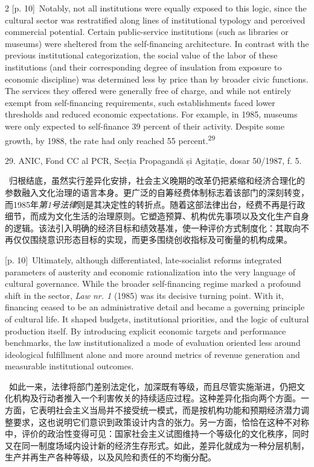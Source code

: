 \documentclass[10pt,a4paper]{article}
\begin{document}
\begin{paracol}{2}
\switchcolumn
{\scriptsize\color{gray} [p. 10]}\ Notably, not all institutions were equally exposed to this logic, since the cultural sector was restratified along lines of institutional typology and perceived commercial potential. Certain public-service institutions (such as libraries or museums) were sheltered from the self-financing architecture. In contrast with the previous institutional categorization, the social value of the labor of these institutions (and their corresponding degree of insulation from exposure to economic discipline) was determined less by price than by broader civic functions. The services they offered were generally free of charge, and while not entirely exempt from self-financing requirements, such establishments faced lower thresholds and reduced economic expectations. For example, in 1985, museums were only expected to self-finance 39 percent of their activity. Despite some growth, by 1988, the rate had only reached 55 percent.\nobreak\textsuperscript{29}\par{\small 29. ANIC, Fond CC al PCR, Secția Propagandă și Agitație, dosar 50/1987, f. 5.\par}
\switchcolumn*
{\scriptsize\color{gray} [p. 10]}\ 归根结底，虽然实行差异化安排，社会主义晚期的改革仍把紧缩和经济合理化的参数融入文化治理的语言本身。更广泛的自筹经费体制标志着该部门的深刻转变，而1985年\textit{第1号法律}则是其决定性的转折点。随着这部法律出台，经费不再是行政细节，而成为文化生活的治理原则。它塑造预算、机构优先事项以及文化生产自身的逻辑。该法引入明确的经济目标和绩效基准，使一种评价方式制度化：其取向不再仅仅围绕意识形态目标的实现，而更多围绕创收指标及可衡量的机构成果。\par
\switchcolumn
{\scriptsize\color{gray} [p. 10]}\ Ultimately, although differentiated, late-socialist reforms integrated parameters of austerity and economic rationalization into the very language of cultural governance. While the broader self-financing regime marked a profound shift in the sector, \textit{Law nr. 1} (1985) was its decisive turning point. With it, financing ceased to be an administrative detail and became a governing principle of cultural life. It shaped budgets, institutional priorities, and the logic of cultural production itself. By introducing explicit economic targets and performance benchmarks, the law institutionalized a mode of evaluation oriented less around ideological fulfillment alone and more around metrics of revenue generation and measurable institutional outcomes.\par
\switchcolumn*
{\scriptsize\color{gray} [p. 10]}\ 如此一来，法律将部门差别法定化，加深既有等级，而且尽管实施渐进，仍把文化机构及行动者推入一个利害攸关的持续适应过程。这种差异化指向两个方面。一方面，它表明社会主义当局并不接受统一模式，而是按机构功能和预期经济潜力调整要求，这也说明它们意识到政策设计内含的张力。另一方面，恰恰在这种不对称中，评价的政治性变得可见：国家社会主义试图维持一个等级化的文化秩序，同时又在同一制度场域内设计新的经济生存形式。如此，差异化就成为一种分层机制，生产并再生产各种等级，以及风险和责任的不均衡分配。\par

\end{paracol}
\end{document}
